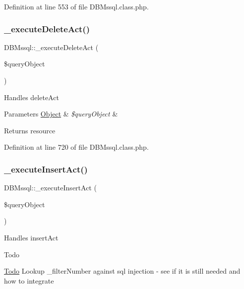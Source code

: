 Definition at line 553 of file D\+B\+Mssql.\+class.\+php.

\hypertarget{classDBMssql_a871bd07e7224b27daba828686ee57a8a}{}\label{classDBMssql_a871bd07e7224b27daba828686ee57a8a} 
\subsubsection{\texorpdfstring{\+\_\+execute\+Delete\+Act()}{\_executeDeleteAct()}}
{\footnotesize\ttfamily D\+B\+Mssql\+::\+\_\+execute\+Delete\+Act (\begin{DoxyParamCaption}\item[{}]{\$query\+Object }\end{DoxyParamCaption})}

Handles delete\+Act 
\begin{DoxyParams}[1]{Parameters}
\hyperlink{classObject}{Object} & {\em \$query\+Object} & \\
\hline
\end{DoxyParams}
\begin{DoxyReturn}{Returns}
resource 
\end{DoxyReturn}


Definition at line 720 of file D\+B\+Mssql.\+class.\+php.

\hypertarget{classDBMssql_aa3f04ce5bee8d9e11db7de7293055fef}{}\label{classDBMssql_aa3f04ce5bee8d9e11db7de7293055fef} 
\subsubsection{\texorpdfstring{\+\_\+execute\+Insert\+Act()}{\_executeInsertAct()}}
{\footnotesize\ttfamily D\+B\+Mssql\+::\+\_\+execute\+Insert\+Act (\begin{DoxyParamCaption}\item[{}]{\$query\+Object }\end{DoxyParamCaption})}

Handles insert\+Act \begin{DoxyRefDesc}{Todo}
\item[\hyperlink{todo__todo000002}{Todo}]Lookup \+\_\+filter\+Number against sql injection -\/ see if it is still needed and how to integrate \end{DoxyRefDesc}


